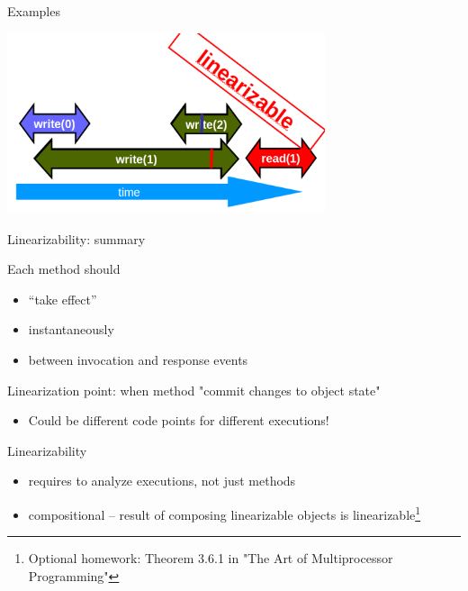 \begin{frame}{Examples}
\begin{center} \includegraphics[width=0.7\textwidth]{./pics/linear/90.png} \end{center}
\end{frame}


\begin{frame}{Linearizability: summary}

Each method should
\begin{itemize}
  \item “take effect”
  \item instantaneously
  \item between invocation and response events
\end{itemize}

Linearization point: when method "commit changes to object state"
\begin{itemize}
  \item Could be different code points for different executions!
\end{itemize}

Linearizability
\begin{itemize}
 \item requires to analyze executions, not just methods
 \item compositional -- result of composing linearizable objects is linearizable\footnote{Optional homework: Theorem 3.6.1 in "The Art of Multiprocessor Programming"}
\end{itemize}

\end{frame}


